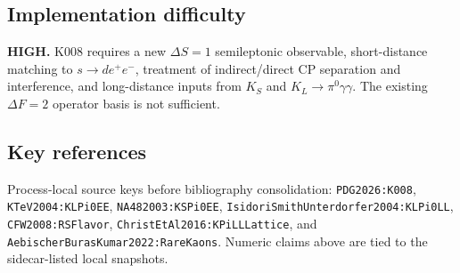 \subsection*{Implementation difficulty}
\textbf{HIGH.}  K008 requires a new \(\Delta S=1\) semileptonic observable,
short-distance matching to \(s\to d e^+e^-\), treatment of indirect/direct CP
separation and interference, and long-distance inputs from \(K_S\) and
\(K_L\to\pi^0\gamma\gamma\).  The existing \(\Delta F=2\) operator basis is not
sufficient.

\subsection*{Key references}
Process-local source keys before bibliography consolidation:
\texttt{PDG2026:K008}, \texttt{KTeV2004:KLPi0EE},
\texttt{NA482003:KSPi0EE}, \texttt{IsidoriSmithUnterdorfer2004:KLPi0LL},
\texttt{CFW2008:RSFlavor}, \texttt{ChristEtAl2016:KPiLLLattice}, and
\texttt{AebischerBurasKumar2022:RareKaons}.  Numeric claims above are tied to
the sidecar-listed local snapshots.
